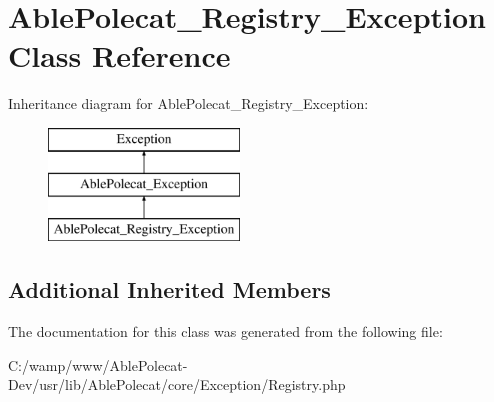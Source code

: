 \hypertarget{class_able_polecat___registry___exception}{}\section{Able\+Polecat\+\_\+\+Registry\+\_\+\+Exception Class Reference}
\label{class_able_polecat___registry___exception}
Inheritance diagram for Able\+Polecat\+\_\+\+Registry\+\_\+\+Exception\+:\begin{figure}[H]
\begin{center}
\leavevmode
\includegraphics[height=3.000000cm]{class_able_polecat___registry___exception}
\end{center}
\end{figure}
\subsection*{Additional Inherited Members}


The documentation for this class was generated from the following file\+:\begin{DoxyCompactItemize}
\item 
C\+:/wamp/www/\+Able\+Polecat-\/\+Dev/usr/lib/\+Able\+Polecat/core/\+Exception/Registry.\+php\end{DoxyCompactItemize}
